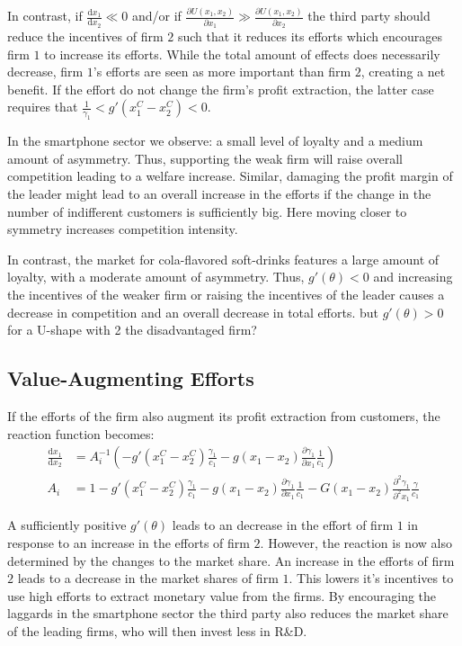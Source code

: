 \documentclass[a4paper, 11pt]{article}
\renewcommand{\d}{\text{d}}
\begin{document}
In contrast, if $\frac{\d x_1}{\d x_2}\ll0$ and/or if $\frac{\partial U(x_1,x_2)}{\partial x_1}\gg \frac{\partial U(x_1,x_2)}{\partial x_2}$ the third party should reduce the incentives of firm $2$ such that it reduces its efforts which encourages firm $1$ to increase its efforts. While the total amount of effects does necessarily decrease, firm $1$'s efforts are seen as more important than firm $2$, creating a net benefit. If the effort do not change the firm's profit extraction, the latter case requires that $\frac{1}{\gamma_1}<g'(x_1^C-x_2^C)<0$.

In the smartphone sector we observe: a small level of loyalty and a medium amount of asymmetry. Thus, supporting the weak firm will raise overall competition leading to a welfare increase. Similar, damaging the profit margin of the leader might lead to an overall increase in the efforts if the change in the number of indifferent customers is sufficiently big. Here moving closer to symmetry increases competition intensity.

In contrast, the market for cola-flavored soft-drinks features a large amount of loyalty, with a moderate amount of asymmetry. Thus, $g'(\theta)<0$ and increasing the incentives of the weaker firm or raising the incentives of the leader causes a decrease in competition and an overall decrease in total efforts. but $g'(\theta) > 0$ for a U-shape with 2 the disadvantaged firm?

\subsection{Value-Augmenting Efforts}
If the efforts of the firm also augment its profit extraction from customers, the reaction function becomes:
\begin{align}
\frac{\d x_1}{\d x_2} &= A_i^{-1} \left(-g'(x_1^C-x_2^C)\frac{\gamma_1}{c_1} - g(x_1-x_2)\frac{\partial \gamma_1}{\partial x_1}\frac{1}{c_1}\right)\\
A_i &= 1 - g'(x_1^C-x_2^C)\frac{\gamma_1}{c_1}-g(x_1-x_2)\frac{\partial \gamma_1}{\partial x_1}\frac{1}{c_1}-G(x_1-x_2)\frac{\partial^2 \gamma_1}{\partial^2 x_1}\frac{\gamma}{c_1}
\end{align}

A sufficiently positive $g'(\theta)$ leads to an decrease in the effort of firm $1$ in response to an increase in the efforts of firm $2$. However, the reaction is now also determined by the changes to the market share. An increase in the efforts of firm $2$ leads to a decrease in the market shares of firm $1$. This lowers it's incentives to use high efforts to extract monetary value from the firms. By encouraging the laggards in the smartphone sector the third party also reduces the market share of the leading firms, who will then invest less in R\&D.
\end{document}
